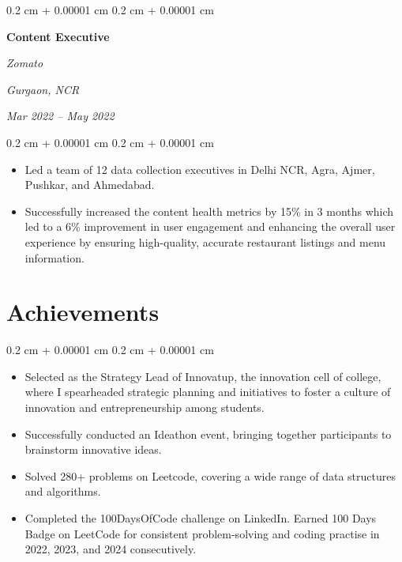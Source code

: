 \documentclass[10pt, letterpaper]{article}
\newenvironment{highlights}{
    \begin{itemize}[
        topsep=0.10 cm,
        parsep=0.10 cm,
        partopsep=0pt,
        itemsep=0pt,
        leftmargin=0.4 cm + 10pt
    ]
}{
    \end{itemize}
} %
\newenvironment{onecolentry}{
    \begin{adjustwidth}{
        0.2 cm + 0.00001 cm
    }{
        0.2 cm + 0.00001 cm
    }
}{
    \end{adjustwidth}
} %
\newenvironment{twocolentry}[2][]{
    \onecolentry
    \def\secondColumn{#2}
    \setcolumnwidth{\fill, 4.5 cm}
    \begin{paracol}{2}
}{
    \switchcolumn \raggedleft \secondColumn
    \end{paracol}
    \endonecolentry
} %
\begin{document}
        \vspace{0.2 cm}

        \begin{twocolentry}{
        \textit{Gurgaon, NCR}    
            
        \textit{Mar 2022 – May 2022}}
            \textbf{Content Executive}
            
            \textit{Zomato}
        \end{twocolentry}

        \vspace{0.10 cm}
        \begin{onecolentry}
            \begin{highlights}
                \item Led a team of 12 data collection executives in Delhi NCR, Agra, Ajmer, Pushkar, and Ahmedabad.
                \item Successfully increased the content health metrics by 15\% in 3 months which led to a 6\% improvement in user engagement and enhancing the overall user experience by ensuring high-quality, accurate restaurant listings and menu information.
            \end{highlights}
        \end{onecolentry}



\section{Achievements}


        \vspace{0.10 cm}
        \begin{onecolentry}
            \begin{highlights}
                \item Selected as the Strategy Lead of Innovatup, the innovation cell of college, where I spearheaded strategic planning and initiatives to foster a culture of innovation and entrepreneurship among students.
                \item Successfully conducted an Ideathon event, bringing together participants to brainstorm innovative ideas.
                \item Solved 280+ problems on Leetcode, covering a wide range of data structures and algorithms. 
                \item Completed the 100DaysOfCode challenge on LinkedIn. Earned 100 Days Badge on LeetCode for consistent problem-solving and coding practise in 2022, 2023, and 2024 consecutively.
            \end{highlights}
        \end{onecolentry}
\end{document}
